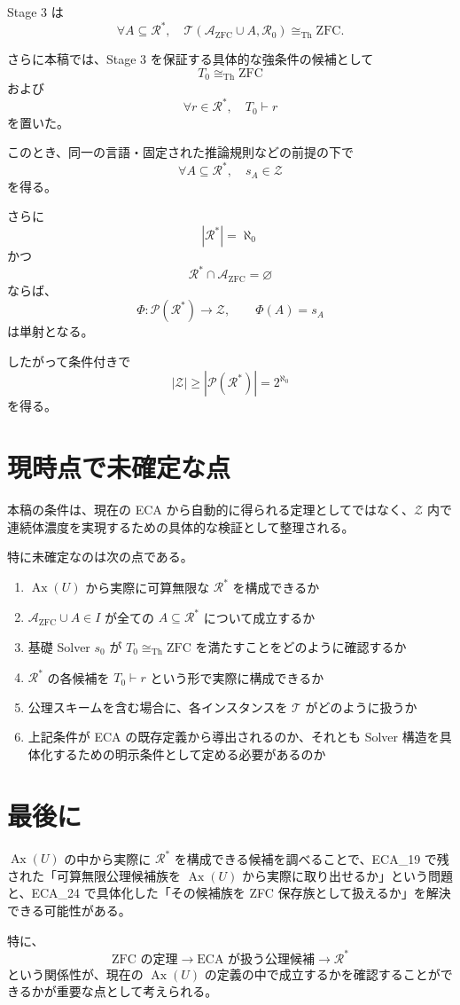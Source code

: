 \documentclass[a4paper,11pt]{article}
\begin{document}
Stage 3 は
\[
\forall A\subseteq\mathcal{R}^*,\quad
\mathcal{T}(\mathcal{A}_{\mathrm{ZFC}}\cup A,\mathcal{R}_0)
\cong_{\mathrm{Th}}\mathrm{ZFC}.
\]

さらに本稿では、Stage 3 を保証する具体的な強条件の候補として
\[
T_0\cong_{\mathrm{Th}}\mathrm{ZFC}
\]
および
\[
\forall r\in\mathcal{R}^*,\quad T_0\vdash r
\]
を置いた。

このとき、同一の言語・固定された推論規則などの前提の下で
\[
\forall A\subseteq\mathcal{R}^*,\quad s_A\in\mathcal{Z}
\]
を得る。

さらに
\[
|\mathcal{R}^*|=\aleph_0
\]
かつ
\[
\mathcal{R}^*\cap\mathcal{A}_{\mathrm{ZFC}}=\varnothing
\]
ならば、
\[
\Phi:\mathcal{P}(\mathcal{R}^*)\to\mathcal{Z},
\qquad
\Phi(A)=s_A
\]
は単射となる。

したがって条件付きで
\[
|\mathcal{Z}|
\ge
|\mathcal{P}(\mathcal{R}^*)|
=
2^{\aleph_0}
\]
を得る。

\section{現時点で未確定な点}

本稿の条件は、現在の ECA から自動的に得られる定理としてではなく、$\mathcal{Z}$ 内で連続体濃度を実現するための具体的な検証として整理される。

特に未確定なのは次の点である。

\begin{enumerate}
\item $\operatorname{Ax}(U)$ から実際に可算無限な $\mathcal{R}^*$ を構成できるか
\item $\mathcal{A}_{\mathrm{ZFC}}\cup A\in I$ が全ての $A\subseteq\mathcal{R}^*$ について成立するか
\item 基礎 Solver $s_0$ が $T_0\cong_{\mathrm{Th}}\mathrm{ZFC}$ を満たすことをどのように確認するか
\item $\mathcal{R}^*$ の各候補を $T_0\vdash r$ という形で実際に構成できるか
\item 公理スキームを含む場合に、各インスタンスを $\mathcal{T}$ がどのように扱うか
\item 上記条件が ECA の既存定義から導出されるのか、それとも Solver 構造を具体化するための明示条件として定める必要があるのか
\end{enumerate}

\section{最後に}
$\operatorname{Ax}(U)$ の中から実際に $\mathcal{R}^*$ を構成できる候補を調べることで、ECA_19 で残された「可算無限公理候補族を $\operatorname{Ax}(U)$ から実際に取り出せるか」という問題と、ECA_24 で具体化した「その候補族を ZFC 保存族として扱えるか」を解決できる可能性がある。

特に、
\[
\text{ZFC の定理}
\longrightarrow
\text{ECA が扱う公理候補}
\longrightarrow
\mathcal{R}^*
\]
という関係性が、現在の $\operatorname{Ax}(U)$ の定義の中で成立するかを確認することができるかが重要な点として考えられる。
\end{document}
